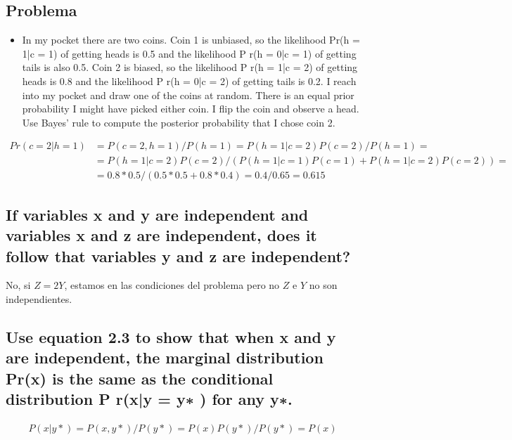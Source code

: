 \documentclass[11pt]{article}
\begin{document}
\subsection{Problema}
\label{sec:org311a0f5}
\begin{itemize}
\item In my pocket there are two coins. Coin 1 is unbiased, so the
likelihood Pr(h = 1|c = 1) of getting heads is 0.5 and the
likelihood P r(h = 0|c = 1) of getting tails is also 0.5. Coin 2 is
biased, so the likelihood P r(h = 1|c = 2) of getting heads is 0.8
and the likelihood P r(h = 0|c = 2) of getting tails is 0.2. I reach
into my pocket and draw one of the coins at random. There is an
equal prior probability I might have picked either coin. I flip the
coin and observe a head. Use Bayes’ rule to compute the posterior
probability that I chose coin 2.
\end{itemize}

\begin{align}
Pr(c = 2 | h = 1) &= P(c= 2, h=1) / P(h = 1)  = P(h=1|c=2)P(c=2) / P(h=1) = \\ 
 &=	P(h=1|c=2)P(c=2) / (P(h=1|c=1)P(c=1)+P(h=1|c=2)P(c=2)) = \\
 &=  0.8*0.5 / (0.5*0.5+0.8*0.4) = 0.4 / 0.65 = 0.615
\end{align}

\subsection{If variables x and y are independent and variables x and z are independent, does it follow that variables y and z are independent?}
\label{sec:orgb098a94}

No, si \(Z = 2Y\), estamos en las condiciones del problema pero no \(Z\) e
\(Y\) no son independientes. 

\subsection{Use equation 2.3 to show that when x and y are independent, the marginal distribution Pr(x) is the same as the conditional distribution P r(x|y = y∗ ) for any y∗.}
\label{sec:org0d1c9b4}

\begin{LATEX}
\begin{align}
	P(x|y*) = P(x,y*) / P(y*) = P(x)P(y*) /P(y*) = P(x)
\end{align}
\end{LATEX}
\end{document}
